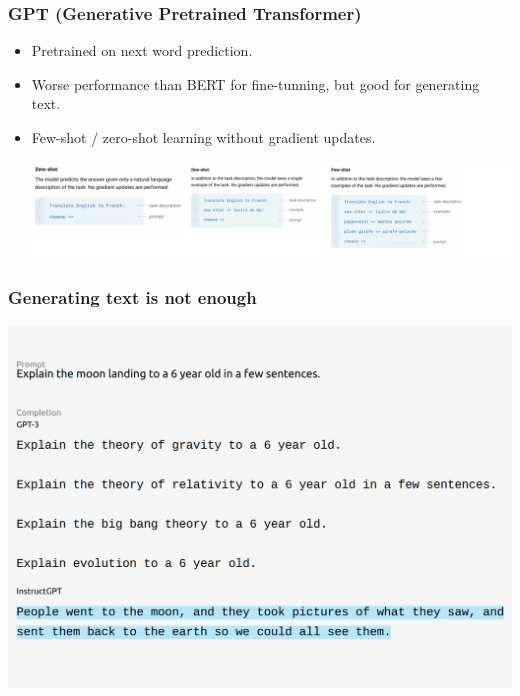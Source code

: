 \documentclass{beamer}
\begin{document}
\begin{frame}	
	
	\frametitle{GPT (Generative Pretrained Transformer)}
	\pause
	\begin{itemize}
		\item Pretrained on next word prediction.
		\pause
		\item Worse performance than BERT for fine-tunning, but good for  generating text.
		\pause
		\item Few-shot / zero-shot learning without gradient updates.
		
			\begin{center}
			\includegraphics[scale=0.20]{few_shot}		
		\end{center}
		
		
	\end{itemize}
	
\end{frame}

\begin{frame}
	\frametitle{Generating text is not enough}
	\pause
		\begin{center}
		\includegraphics[scale=0.18]{instruct_gpt}		
	\end{center}
	
\end{frame}
	
\end{document}
